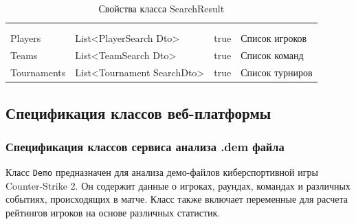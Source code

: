 \begin{xltabular}{\textwidth}{|X|X|X|X|}
	\caption{Свойства класса SearchResult}\label{table:SearchResult}\\ \hline
	 &  &  &  \\ \hline
	 &  &  &  \\ \hline
	\endfirsthead
	 \hline
	 &  &  &  \\ \hline
	\endhead
	Players & List<PlayerSearch
	Dto> & true & Список игроков \\ \hline
	Teams & List<TeamSearch
	Dto> & true & Список команд \\ \hline
	Tournaments & List<Tournament
	SearchDto> & true & Список турниров \\ \hline
\end{xltabular}

\subsection{Спецификация классов веб-платформы}
\subsubsection{Спецификация классов сервиса анализа .dem файла}

Класс \texttt{Demo} предназначен для анализа демо-файлов киберспортивной игры Counter-Strike 2. Он содержит данные о игроках, раундах, командах и различных событиях, происходящих в матче. Класс также включает переменные для расчета рейтингов игроков на основе различных статистик.

